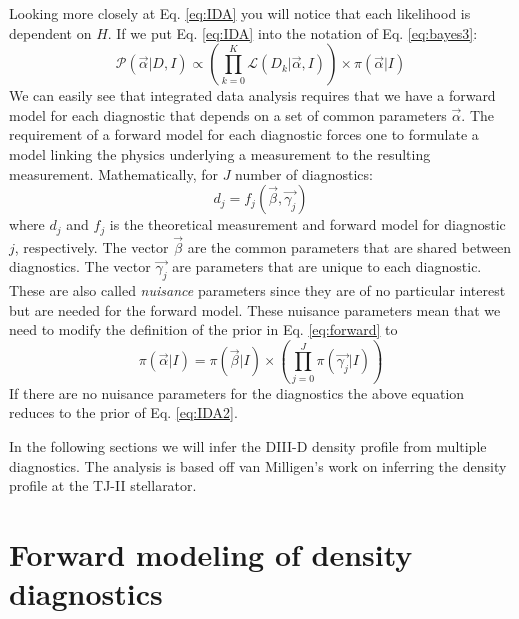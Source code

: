 \documentclass[12pt]{article}
\numberwithin{equation}{section}
\begin{document}
Looking more closely at Eq. \ref{eq:IDA} you will notice that each likelihood is dependent on $H$. 
If we put Eq. \ref{eq:IDA} into the notation of Eq. \ref{eq:bayes3}:
\begin{equation} \label{eq:IDA2}
	  {\mathcal{P}(\vec{\alpha}|D,I)} \propto {\left( \prod\limits_{k=0}^K{\mathcal{L}(D_k|\vec{\alpha},I)} \right)} \times 
	  {\pi(\vec{\alpha}|I)}
\end{equation}
We can easily see that integrated data analysis requires that we have a forward model for each diagnostic that depends on 
a set of common parameters $\vec{\alpha}$. 
The requirement of a forward model for each diagnostic forces one to formulate a model linking the physics underlying a measurement to 
the resulting measurement. Mathematically, for $J$ number of diagnostics:
\begin{equation} \label{eq:forward}
	d_j = f_j(\vec{\beta},\vec{\gamma_j})
\end{equation}
where $d_j$ and $f_j$ is the theoretical measurement and forward model for diagnostic $j$, respectively. The vector $\vec{\beta}$ are the common parameters that are shared between diagnostics. The vector $\vec{\gamma_j}$ are parameters that are unique to each diagnostic. These are also called \emph{nuisance} parameters since they are of no particular interest but are needed for the forward model. These nuisance parameters mean that we need to modify the definition of the prior in Eq. \ref{eq:forward} to 
\begin{equation} \label{eq:forwardprior}
	\pi ( \vec{\alpha} | I ) = \pi ( \vec{\beta}|I) \times \left( \prod \limits_{j=0}^{J} \pi ( \vec{\gamma_j}|I) \right)
\end{equation}
If there are no nuisance parameters for the diagnostics the above equation reduces to the prior of Eq. \ref{eq:IDA2}.

In the following sections we will infer the DIII-D density profile 
from multiple diagnostics. The analysis is based off van Milligen's 
work on inferring the density profile at the TJ-II stellarator.\cite
{van2011integrated} 
\section{Forward modeling of density diagnostics}
\end{document}
